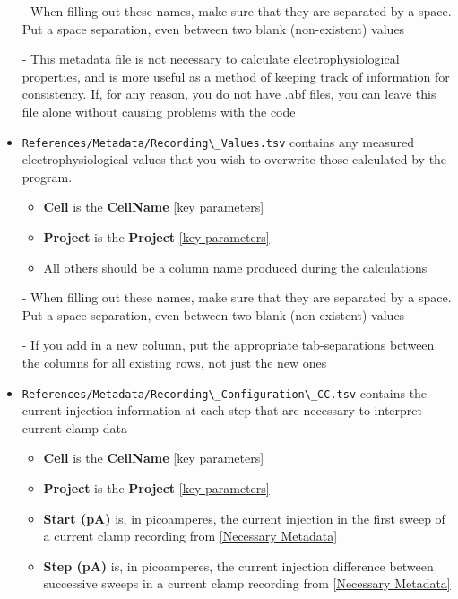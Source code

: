 \documentclass{article}
\begin{document}
\begin{itemize}
    - When filling out these names, make sure that they are separated by a space. Put a space separation, even between two blank (non-existent) values
    
    - This metadata file is not necessary to calculate electrophysiological properties, and is more useful as a method of keeping track of information for consistency. If, for any reason, you do not have .abf files, you can leave this file alone without causing problems with the code
    
    \item \verb|References/Metadata/Recording\_Values.tsv| contains any measured electrophysiological values that you wish to overwrite those calculated by the program.
    \begin{itemize}
        \item \textbf{Cell} is the \textbf{CellName} \ref{key parameters}
        
        \item \textbf{Project} is the \textbf{Project} \ref{key parameters}
        
        \item All others should be a column name produced during the calculations
    \end{itemize}
    
    - When filling out these names, make sure that they are separated by a space. Put a space separation, even between two blank (non-existent) values
    
    - If you add in a new column, put the appropriate tab-separations between the columns for all existing rows, not just the new ones
    
    \item \verb|References/Metadata/Recording\_Configuration\_CC.tsv| contains the current injection information at each step that are necessary to interpret current clamp data
    \begin{itemize}
        \item \textbf{Cell} is the \textbf{CellName} \ref{key parameters}
        
        \item \textbf{Project} is the \textbf{Project} \ref{key parameters}
        
        \item \textbf{Start (pA)} is, in picoamperes, the current injection in the first sweep of a current clamp recording from \ref{Necessary Metadata}
        
        \item \textbf{Step (pA)} is, in picoamperes, the current injection difference between successive sweeps in a current clamp recording from \ref{Necessary Metadata}
        

\end{itemize}
\end{itemize}
\end{document}
